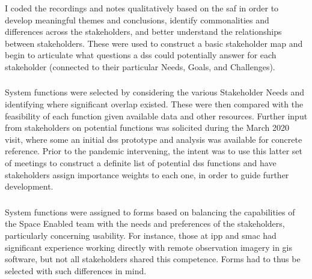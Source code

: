 I coded the recordings and notes qualitatively based on the \ac{saf} in order to develop meaningful themes and conclusions, identify commonalities and differences across the stakeholders, and better understand the relationships between stakeholders. These were used to construct a basic stakeholder map and begin to articulate what questions a \ac{dss} could potentially answer for each stakeholder (connected to their particular Needs, Goals, and Challenges). 

\subsubsection{}

System functions were selected by considering the various Stakeholder Needs and identifying where significant overlap existed. These were then compared with the feasibility of each function given available data and other resources. Further input from stakeholders on potential functions was solicited during the March 2020 visit, where some an initial \ac{dss} prototype and analysis was available for concrete reference. Prior to the pandemic intervening, the intent was to use this latter set of meetings to construct a definite list of potential \ac{dss} functions and have stakeholders assign importance weights to each one, in order to guide further development.

\subsubsection{}

System functions were assigned to forms based on balancing the capabilities of the Space Enabled team with the needs and preferences of the stakeholders, particularly concerning usability. For instance, those at \ac{ipp} and \ac{smac} had significant experience working directly with remote observation imagery in \ac{gis} software, but not all stakeholders shared this competence. Forms had to thus be selected with such differences in mind.


\subsubsection{}

